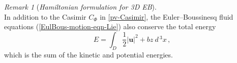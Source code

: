 \documentclass[11pt, oneside]{article}   	%
\numberwithin{equation}{section}
\theoremstyle{plain}
\theoremstyle{definition}
\theoremstyle{remark}
\newtheorem{remark}[theorem]{Remark}
\newcommand{\<}{\langle}
\renewcommand{\>}{\rangle}
\begin{document}
\begin{remark}[\emph{Hamiltonian formulation for 3D EB}]$\,$\\ \textrm
In addition to the Casimir $C_\Phi$ in \eqref{pv-Casimir}, the Euler--Boussinesq fluid equations (\ref{EulBous-motion-eqn-Lie}) also conserve the total energy 
 \begin{equation}
 E =\int_D %
 \frac{1}{2}|\mathbf{u}|^2+bz %
 \
 d\,^3x
 \,,
\label{EulBouss-erg-def}
\end{equation}
which is the sum of the kinetic and potential energies.


\end{remark}
\end{document}
